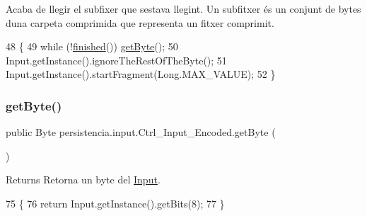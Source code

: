 Acaba de llegir el subfixer que s\textquotesingle{}estava llegint. Un subfitxer és un conjunt de bytes d\textquotesingle{}una carpeta comprimida que representa un fitxer comprimit. 


\begin{DoxyCode}
48                              \{
49         \textcolor{keywordflow}{while} (!\hyperlink{classpersistencia_1_1input_1_1Ctrl__Input_a5a94d207dce0fd592b5ac17f55154d4f}{finished}()) \hyperlink{classpersistencia_1_1input_1_1Ctrl__Input__Encoded_a38ede6bc49251e77ae4be30ccc06457d}{getByte}();
50         Input.getInstance().ignoreTheRestOfTheByte();
51         Input.getInstance().startFragment(Long.MAX\_VALUE);
52     \}
\end{DoxyCode}
\mbox{\label{classpersistencia_1_1input_1_1Ctrl__Input__Encoded_a38ede6bc49251e77ae4be30ccc06457d}} 
\subsubsection{\texorpdfstring{get\+Byte()}{getByte()}}
{\footnotesize\ttfamily public Byte persistencia.\+input.\+Ctrl\+\_\+\+Input\+\_\+\+Encoded.\+get\+Byte (\begin{DoxyParamCaption}{ }\end{DoxyParamCaption})\hspace{0.3cm}{\ttfamily [inline]}}

\begin{DoxyReturn}{Returns}
Retorna un byte del \hyperlink{classpersistencia_1_1input_1_1Input}{Input}. 
\end{DoxyReturn}

\begin{DoxyCode}
75                           \{
76         \textcolor{keywordflow}{return} Input.getInstance().getBits(8);
77     \}
\end{DoxyCode}
\mbox{\label{classpersistencia_1_1input_1_1Ctrl__Input__Encoded_aed32b42778121e7e55d8338d9eaaddb9}} 
